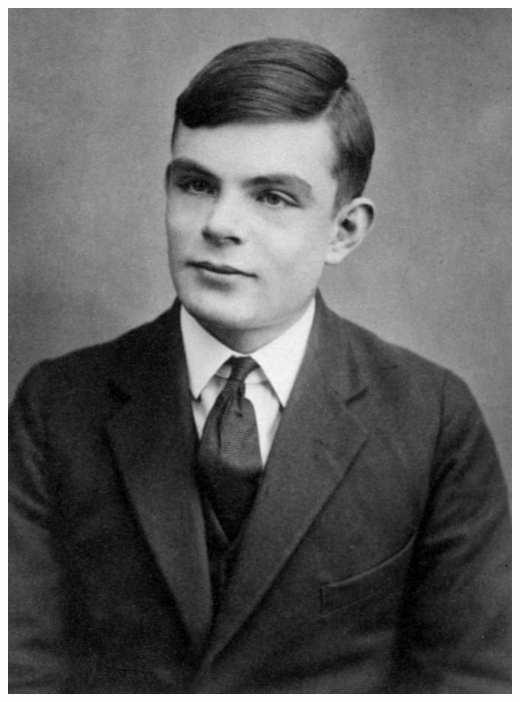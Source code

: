 \begin{multicols}{2}
	\begin{center}
		\includegraphics[height=.8\textheight]{./IMG/Alan_Turing_Aged_16.jpg}
	\end{center}


\end{multicols}
